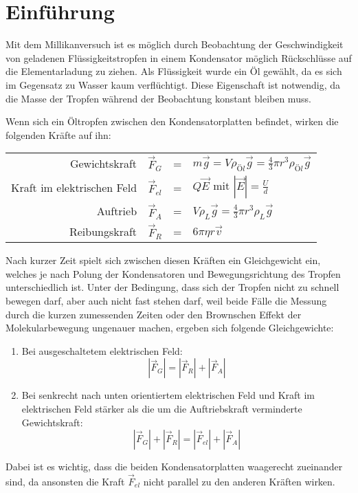 \section{Einführung}
Mit dem Millikanversuch ist es möglich durch Beobachtung der Geschwindigkeit von geladenen Flüssigkeitstropfen in einem Kondensator möglich Rückschlüsse auf die Elementarladung zu ziehen. Als Flüssigkeit wurde ein Öl gewählt, da es sich im Gegensatz zu Wasser kaum verflüchtigt. Diese Eigenschaft ist notwendig, da die Masse der Tropfen während der Beobachtung konstant bleiben muss.

Wenn sich ein Öltropfen zwischen den Kondensatorplatten befindet, wirken die folgenden Kräfte auf ihn:
\begin{table}[H]
	\centering
	\begin{tabular}{r c  c  l}
	Gewichtskraft & $\vec{F}_G$ & = & $m\vec{g}=V\rho_{Öl}\vec{g}=\frac{4}{3}\pi r^3 \rho_{Öl}\vec{g}$\\
	Kraft im elektrischen Feld & $\vec{F}_{el}$ & = & $Q\vec{E}$ mit $|\vec{E}|=\frac{U}{d}$\\
	Auftrieb & $\vec{F}_{A}$ & = & $V\rho_L\vec{g}=\frac{4}{3}\pi r^3 \rho_L\vec{g}$\\
	Reibungskraft & $\vec{F}_{R}$ & = & $6\pi \eta r\vec{v}$
	\end{tabular}
\end{table}
Nach kurzer Zeit spielt sich zwischen diesen Kräften ein Gleichgewicht ein, welches je nach Polung der Kondensatoren und Bewegungsrichtung des Tropfen unterschiedlich ist. Unter der Bedingung, dass sich der Tropfen nicht zu schnell bewegen darf, aber auch nicht fast stehen darf, weil beide Fälle die Messung durch die kurzen zumessenden Zeiten oder den Brownschen Effekt der Molekularbewegung ungenauer machen, ergeben sich folgende Gleichgewichte:
\begin{enumerate}
\item Bei ausgeschaltetem elektrischen Feld:
\begin{equation}
|\vec{F}_G|=|\vec{F}_R|+|\vec{F}_A|
\label{eq:keinfeld}
\end{equation}
\item Bei senkrecht nach unten orientiertem elektrischen Feld und Kraft im elektrischen Feld stärker als die um die Auftriebskraft verminderte Gewichtskraft:
\begin{equation}
|\vec{F}_G|+|\vec{F}_R|=|\vec{F}_{el}|+|\vec{F}_A|
\label{eq:mitfeld}
\end{equation}
\end{enumerate}
Dabei ist es wichtig, dass die beiden Kondensatorplatten waagerecht zueinander sind, da ansonsten die Kraft $\vec{F}_{el}$ nicht parallel zu den anderen Kräften wirken.

